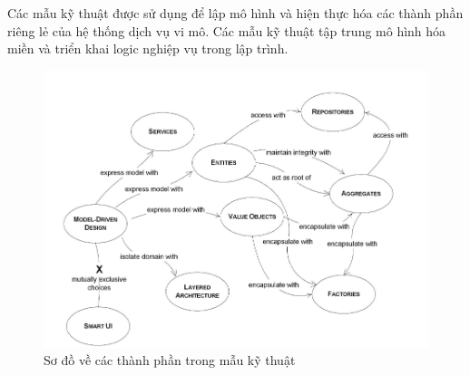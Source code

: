 Các mẫu     kỹ thuật được sử dụng để lập mô hình và hiện thực hóa  các thành phần riêng lẻ của hệ thống dịch vụ vi mô.  Các mẫu     kỹ thuật  tập trung    mô hình hóa miền và triển khai logic nghiệp vụ trong lập trình.




  




\begin{figure}[H]

    \centering
    
    \includegraphics[scale = 0.5]{pictures/cac_mau_ky_thuat/temp.png}
    
\caption{Sơ đồ về các thành phần trong mẫu     kỹ thuật}
    
    \end{figure}
    

  
 